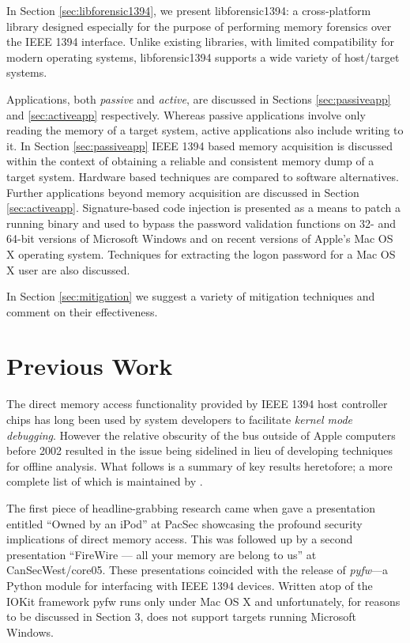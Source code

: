 \documentclass[numbers=noenddot,      %
               abstract,              %
               captions=tableheading, %
               DIV=8]                 %
              {scrartcl}
\begin{document}
In Section \ref{sec:libforensic1394}, we present libforensic1394: a
cross-platform library designed especially for the purpose of performing
memory forensics over the IEEE 1394 interface. Unlike existing
libraries, with limited compatibility for modern operating systems,
libforensic1394 supports a wide variety of host/target systems.

Applications, both \emph{passive} and \emph{active}, are discussed in
Sections \ref{sec:passiveapp} and \ref{sec:activeapp}
respectively. Whereas passive applications involve only reading the
memory of a target system, active applications also include writing to
it. In Section \ref{sec:passiveapp} IEEE 1394 based memory acquisition
is discussed within the context of obtaining a reliable and consistent
memory dump of a target system. Hardware based techniques are compared
to software alternatives. Further applications beyond memory acquisition
are discussed in Section \ref{sec:activeapp}. Signature-based code
injection is presented as a means to patch a running binary and used to
bypass the password validation functions on 32- and 64-bit versions of
Microsoft Windows and on recent versions of Apple's Mac OS X operating
system. Techniques for extracting the logon password for a Mac OS X user
are also discussed.

In Section \ref{sec:mitigation} we suggest a variety of mitigation
techniques and comment on their effectiveness.
 
\section{Previous Work}
\label{sec:previouswork}

The direct memory access functionality provided by IEEE 1394 host
controller chips has long been used by system developers to facilitate
\emph{kernel mode debugging}. However the relative obscurity of the bus
outside of Apple computers before 2002 resulted in the issue being
sidelined in lieu of developing techniques for offline
analysis. What follows is a summary of key results heretofore; a more
complete list of which is maintained by \cite{hermann10}.

The first piece of headline-grabbing research came when
\cite{dornseif04} gave a presentation entitled ``Owned by an iPod'' at
PacSec showcasing the profound security implications of direct memory
access. This was followed up by a second presentation ``FireWire --- all
your memory are belong to us'' \citep{dornseif05} at
\mbox{CanSecWest/core05}. These presentations coincided with the release
of \emph{pyfw}---a Python module for interfacing with IEEE 1394
devices. Written atop of the IOKit framework pyfw runs only under Mac OS
X and unfortunately, for reasons to be discussed in Section 3, does not
support targets running Microsoft Windows.
\end{document}
